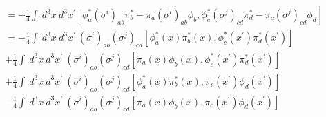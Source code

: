 \documentclass{article}
\begin{document}
\begin{align}
[Q^{i},Q^{j}] &= -\frac{1}{4}\int \: d^3 x \: d^3 x^{\prime}[\phi^{*}_{a} (\sigma^{i})_{ab} \pi^{*}_{b} - \pi_{a} 
				(\sigma^{i})_{ab} \phi_{b}, \phi^{*}_{c} (\sigma^{j})_{cd} \pi^{*}_{d} - \pi_{c} (\sigma^{j})_{cd} \phi_{d} ] \nonumber \\
			  &=-\frac{1}{4}\int \: d^3 x \: d^3 x^{\prime} \:
			   (\sigma^{i})_{ab} (\sigma^{j})_{cd}
			   [\phi^{*}_{a}(x)\pi^{*}_{b}(x),\phi^{*}_{c}(x^{\prime})  \pi^{*}_{d}(x^{\prime})] \nonumber \\
			  &+\frac{1}{4}\int \: d^3 x \: d^3 x^{\prime} \:
			  (\sigma^{i})_{ab} (\sigma^{j})_{cd}
			  [\pi_{a}(x)  \phi_{b}(x),\phi^{*}_{c}(x^{\prime})  \pi^{*}_{d}(x^{\prime})] \nonumber \\
			  &+\frac{1}{4}\int \: d^3 x \: d^3 x^{\prime} \:
			  (\sigma^{i})_{ab} (\sigma^{j})_{cd} 
			  [\phi^{*}_{a}(x)  \pi^{*}_{b}(x), \pi_{c}(x^{\prime})  \phi_{d}(x^{\prime}) ] \nonumber \\
			  &-\frac{1}{4}\int \: d^3 x \: d^3 x^{\prime} \:
			  (\sigma^{i})_{ab} (\sigma^{j})_{cd}
			  [\pi_{a}(x)  \phi_{b}(x), \pi_{c}(x^{\prime})  \phi_{d}(x^{\prime})] \nonumber
\end{align}
\end{document}
